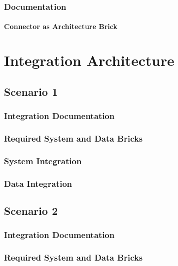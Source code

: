 \documentclass[
     12pt,         %
     a4paper,      %
     BCOR10mm,     %
     DIV14,        %
aragraph skip instad of paragraph indent
     ]{scrreprt}
\begin{document}
\subsection{Documentation}

\subsubsection{Connector as Architecture Brick}


\chapter{Integration Architecture}


\section{Scenario 1}

\subsection{Integration Documentation}

\subsection{Required System and Data Bricks}

\subsection{System Integration}

\subsection{Data Integration}

\section{Scenario 2}

\subsection{Integration Documentation}

\subsection{Required System and Data Bricks}
\end{document}
